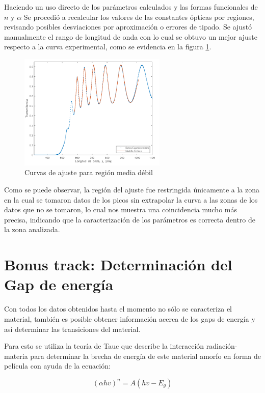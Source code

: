 \documentclass[article]{article}
\begin{document}
\begin{multicols}{2}
        Haciendo un uso directo de los parámetros calculados y las formas funcionales de $n$ y $\alpha$ Se procedió a recalcular los valores de las constantes ópticas por regiones, revisando posibles desviaciones por aproximación o errores de tipado. Se ajustó manualmente el rango de longitud de onda con lo cual se obtuvo un mejor ajuste respecto a la curva experimental, como se evidencia en la figura \ref{fig:ajuste}.
        

        \begin{figure}[H]
            \centering \includegraphics[width= 7cm]{simulacion.png}
            \caption{Curvas de ajuste para región media débil}
            \label{fig:ajuste}
            \end{figure}
        
    Como se puede observar, la región del ajuste fue restringida únicamente a la zona en la cual se tomaron datos de los picos sin extrapolar la curva a las zonas de los datos que no se tomaron, lo cual nos muestra una coincidencia mucho más precisa, indicando que la caracterización de los parámetros es correcta dentro de la zona analizada.
   
    \section{Bonus track: Determinación del Gap de energía}
        
        Con todos los datos obtenidos hasta el momento no sólo se caracteriza el material, también es posible obtener información acerca de los gaps de energía y así determinar las transiciones del material.
        
        Para esto se utiliza la teoría de Tauc que describe la interacción radiación-materia para determinar la brecha de energía de este material amorfo en forma de película con ayuda de la ecuación:
        
        \begin{equation}
            (\alpha h v)^n=A(hv-E_g)
        \end{equation}
        

\end{multicols}
\end{document}
